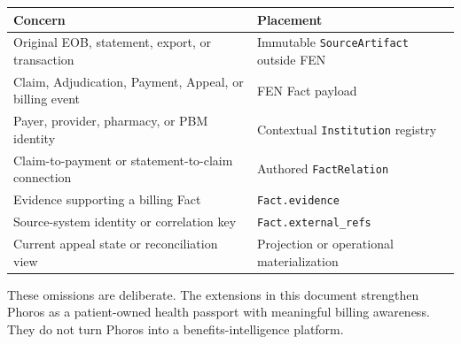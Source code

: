 \documentclass[11pt]{article}
\begin{document}
\begin{center}
\small
\renewcommand{\arraystretch}{1.15}
\begin{tabular}{>{\raggedright\arraybackslash}p{5.4cm} >{\raggedright\arraybackslash}p{7.6cm}}
\textbf{Concern} & \textbf{Placement} \\
\hline
Original EOB, statement, export, or transaction & Immutable \texttt{SourceArtifact} outside FEN \\
Claim, Adjudication, Payment, Appeal, or billing event & FEN Fact payload \\
Payer, provider, pharmacy, or PBM identity & Contextual \texttt{Institution} registry \\
Claim-to-payment or statement-to-claim connection & Authored \texttt{FactRelation} \\
Evidence supporting a billing Fact & \texttt{Fact.evidence} \\
Source-system identity or correlation key & \texttt{Fact.external\_refs} \\
Current appeal state or reconciliation view & Projection or operational materialization \\
\end{tabular}
\end{center}

These omissions are deliberate. The extensions in this document
strengthen Phoros as a patient-owned health passport with meaningful
billing awareness. They do not turn Phoros into a benefits-intelligence
platform.
\end{document}
